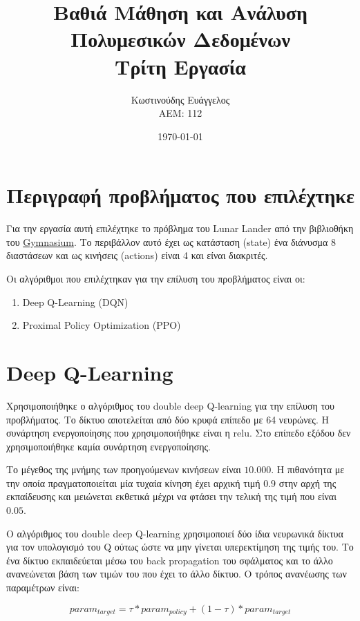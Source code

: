 \documentclass[a4paper]{article}
\title{Βαθιά Μάθηση και Ανάλυση Πολυμεσικών Δεδομένων \\ Τρίτη Εργασία}
\author{Κωστινούδης Ευάγγελος \\ΑΕΜ: 112}
\date{\today}
\begin{document}
\maketitle
{}
\newpage
{}

\section{Περιγραφή προβλήματος που επιλέχτηκε}

Για την εργασία αυτή επιλέχτηκε το πρόβλημα του Lunar Lander από την βιβλιοθήκη
του
\href{https://gymnasium.farama.org/environments/box2d/lunar_lander/}{Gymnasium}.
Το περιβάλλον αυτό έχει ως κατάσταση (state) ένα διάνυσμα 8 διαστάσεων και ως
κινήσεις (actions) είναι 4 και είναι διακριτές.

Οι αλγόριθμοι που επιλέχτηκαν για την επίλυση του προβλήματος είναι οι:

\begin{enumerate}
\item Deep Q-Learning (DQN)
\item Proximal Policy Optimization (PPO)
\end{enumerate}


\section{Deep Q-Learning}

Χρησιμοποιήθηκε ο αλγόριθμος του double deep Q-learning για την επίλυση του
προβλήματος. Το δίκτυο αποτελείται από δύο κρυφά επίπεδο με 64 νευρώνες. Η
συνάρτηση ενεργοποίησης που χρησιμοποιήθηκε είναι η relu. Στο επίπεδο εξόδου δεν
χρησιμοποιήθηκε καμία συνάρτηση ενεργοποίησης.

Το μέγεθος της μνήμης των προηγούμενων κινήσεων είναι $10.000$. Η πιθανότητα με
την οποία πραγματοποιείται μία τυχαία κίνηση έχει αρχική τιμή $0.9$ στην αρχή
της εκπαίδευσης και μειώνεται εκθετικά μέχρι να φτάσει την τελική της τιμή που
είναι $0.05$.

Ο αλγόριθμος του double deep Q-learning χρησιμοποιεί δύο ίδια νευρωνικά δίκτυα
για τον υπολογισμό του Q ούτως ώστε να μην γίνεται υπερεκτίμηση της τιμής του.
Το ένα δίκτυο εκπαιδεύεται μέσω του back propagation του σφάλματος και το άλλο
ανανεώνεται βάση των τιμών του που έχει το άλλο δίκτυο. Ο τρόπος ανανέωσης των
παραμέτρων είναι:

\begin{equation*}
    param_{target} = \tau * param_{policy} + (1-\tau) * param_{target}
\end{equation*}
\end{document}
